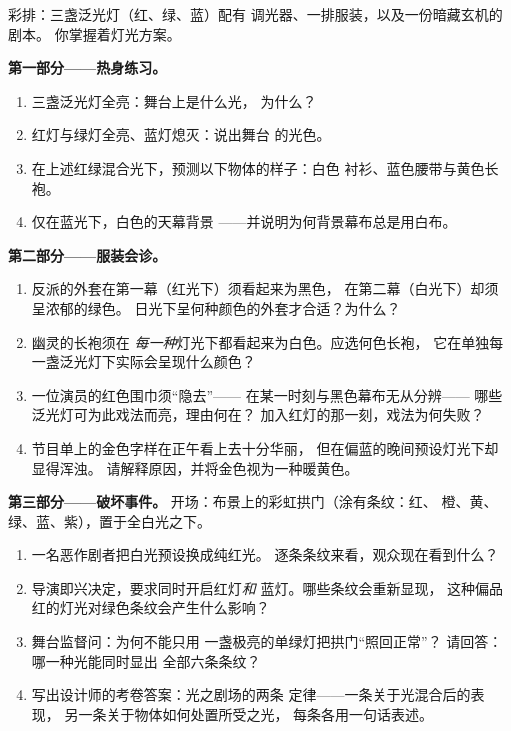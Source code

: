 \begin{problem}\label{pb:g8:colors-spectra:1}
彩排：三盏泛光灯（红、绿、蓝）配有
调光器、一排服装，以及一份暗藏玄机的剧本。
你掌握着灯光方案。

\medskip\noindent\textbf{第一部分——热身练习。}
\begin{enumerate}
  \item 三盏泛光灯全亮：舞台上是什么光，
        为什么？
  \item 红灯与绿灯全亮、蓝灯熄灭：说出舞台
        的光色。
  \item 在上述红绿混合光下，预测以下物体的样子：白色
        衬衫、蓝色腰带与黄色长袍。
  \item 仅在蓝光下，白色的天幕背景
        ——并说明为何背景幕布总是用白布。
\end{enumerate}

\medskip\noindent\textbf{第二部分——服装会诊。}
\begin{enumerate}[resume]
  \item 反派的外套在第一幕（红光下）须看起来为黑色，
        在第二幕（白光下）却须呈浓郁的绿色。
        日光下呈何种颜色的外套才合适？为什么？
  \item 幽灵的长袍须在
        \emph{每一种}灯光下都看起来为白色。应选何色长袍，
        它在单独每一盏泛光灯下实际会呈现什么颜色？
  \item 一位演员的红色围巾须“隐去”——
        在某一时刻与黑色幕布无从分辨——
        哪些泛光灯可为此戏法而亮，理由何在？
        加入红灯的那一刻，戏法为何失败？
  \item 节目单上的金色字样在正午看上去十分华丽，
        但在偏蓝的晚间预设灯光下却显得浑浊。
        请解释原因，并将金色视为一种暖黄色。
\end{enumerate}

\medskip\noindent\textbf{第三部分——破坏事件。}
开场：布景上的彩虹拱门（涂有条纹：红、
橙、黄、绿、蓝、紫），置于全白光之下。
\begin{enumerate}[resume]
  \item 一名恶作剧者把白光预设换成纯红光。
        逐条条纹来看，观众现在看到什么？
  \item 导演即兴决定，要求同时开启红灯\emph{和}
        蓝灯。哪些条纹会重新显现，
        这种偏品红的灯光对绿色条纹会产生什么影响？
  \item 舞台监督问：为何不能只用
        一盏极亮的单绿灯把拱门“照回正常”？
        请回答：哪一种光能同时显出
        全部六条条纹？
  \item 写出设计师的考卷答案：光之剧场的两条
        定律——一条关于光混合后的表现，
        另一条关于物体如何处置所受之光，
        每条各用一句话表述。
\end{enumerate}
\end{problem}
